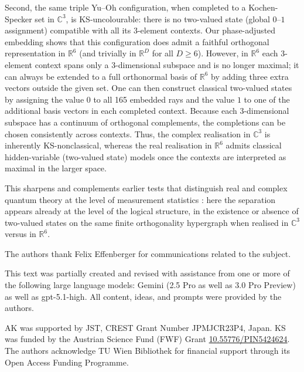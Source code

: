 \documentclass[%
  reprint,
  superscriptaddress,
  amsmath,amssymb,
  pra,
  floatfix,
  longbibliography
]{revtex4-2}
\begin{document}
Second, the same triple Yu--Oh configuration, when completed to a
Kochen-Specker set in $\mathbb{C}^3$, is KS-uncolourable: there is no
two-valued state (global $0$--$1$ assignment) compatible with all its
3-element contexts. Our phase-adjusted embedding shows that this
configuration does admit a faithful orthogonal representation in
$\mathbb{R}^6$ (and trivially in $\mathbb{R}^D$ for all $D\ge 6$). However,
in $\mathbb{R}^6$ each 3-element context spans only a 3-dimensional subspace
and is no longer maximal; it can always be extended to a full orthonormal
basis of $\mathbb{R}^6$ by adding three extra vectors outside the given set.
One can then construct classical two-valued states by assigning the value
$0$ to all 165 embedded rays and the value $1$ to one of the additional
basis vectors in each completed context. Because each 3-dimensional subspace
has a continuum of orthogonal complements, the completions can be chosen
consistently across contexts. Thus, the complex realisation in $\mathbb{C}^3$
is inherently KS-nonclassical, whereas the real realisation in
$\mathbb{R}^6$ admits classical hidden-variable (two-valued state) models once the
contexts are interpreted as maximal in the larger space.

This sharpens and complements earlier tests that distinguish real and
complex quantum theory at the level of measurement statistics
\cite{mckague-2009,renou-2021,wu-2022}: here the separation appears already
at the level of the logical structure, in the existence or absence of
two-valued states on the same finite orthogonality hypergraph when realised
in $\mathbb{C}^3$ versus in $\mathbb{R}^6$.


\begin{acknowledgments}
The authors thank Felix Effenberger for communications related to the subject.

This text was partially created and revised with assistance from one or more of the following large language models:  Gemini (2.5 Pro as well as 3.0 Pro Preview)
as well as gpt-5.1-high. All content, ideas, and prompts were provided by the authors.


AK was supported by JST, CREST Grant Number JPMJCR23P4, Japan.
KS was funded by the Austrian Science Fund (FWF) Grant \href{https://doi.org/10.55776/PIN5424624}{10.55776/PIN5424624}.
The authors acknowledge TU Wien Bibliothek for financial support through its Open Access Funding Programme.

\end{acknowledgments}


\end{document}
